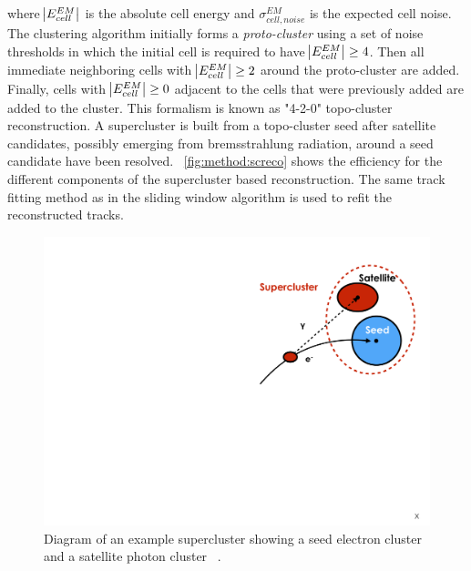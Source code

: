 where $\abs{E^{EM}_{cell}}$ is the absolute cell energy and $\sigma^{EM}_{cell,noise}$ is the expected cell noise. The clustering algorithm initially forms a \emph{proto-cluster} using a set of noise thresholds in which the initial cell is required to have $\abs{E^{EM}_{cell}} \geq 4$. Then all immediate neighboring cells with $\abs{E^{EM}_{cell}} \geq 2$ around the proto-cluster are added. Finally, cells with $\abs{E^{EM}_{cell}} \geq 0$ adjacent to the cells that were previously added are added to the cluster. This formalism is known as "4-2-0" topo-cluster reconstruction.
A supercluster is built from a topo-cluster seed after satellite candidates, possibly emerging from bremsstrahlung radiation, around a seed candidate have been resolved. ~\cref{fig:method:screco} shows the efficiency for the different components of the supercluster based reconstruction. The same track fitting method as in the sliding window algorithm is used to refit the reconstructed tracks.
\begin{figure}[h]
    \centering
    \includegraphics[width=\mediumfigwidth]{images/topo-cluster.pdf}
    \caption[Diagram of an example supercluster showing a seed electron cluster and a satellite photon cluster.]{Diagram of an example supercluster showing a seed electron cluster and a satellite photon cluster ~\cite{ATL-PHYS-PUB-2017-022}.}
    \label{fig:method:superclusterscheme}
\end{figure}
